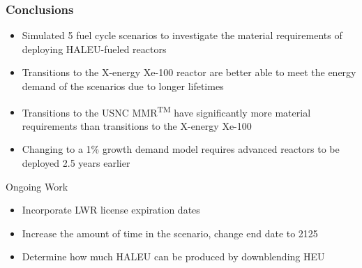 \begin{frame}
    \frametitle{Conclusions}
    \begin{itemize}
        \item Simulated 5 fuel cycle scenarios to investigate the material 
              requirements of deploying \gls{HALEU}-fueled reactors
        \item Transitions to the X-energy Xe-100 reactor are better able to meet 
              the energy demand of the scenarios due to longer lifetimes
        \item Transitions to the \gls{USNC} \gls{MMR}\textsuperscript{TM}
              have significantly more material requirements than transitions to 
              the X-energy Xe-100
        \item Changing to a 1\% growth demand model requires 
              advanced reactors to be deployed 2.5 years earlier
    \end{itemize}
    \begin{block}{Ongoing Work}
        \begin{itemize}
            \item Incorporate \gls{LWR} license expiration dates
            \item Increase the amount of time in the scenario, change end date to 2125
            \item Determine how much \gls{HALEU} can be produced by downblending \gls{HEU}
        \end{itemize}
    \end{block}
\end{frame}
